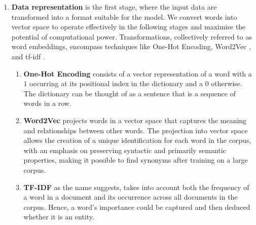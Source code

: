 \begin{enumerate}
    \item \textbf{Data representation} is the first stage, where the input data are transformed into a format suitable for the model. We convert words into vector space to operate effectively in the following stages and maximise the potential of computational power. Transformations, collectively referred to as word embeddings, encompass techniques like One-Hot Encoding, Word2Vec \parencite{mikolov2013word2vec}, and \acrfull{tf-idf} \parencite{AIZAWA200345tfidf}. 
    
    \begin{enumerate}
    \item \textbf{One-Hot Encoding} consists of a vector representation of a word with a $1$ occurring at its positional index in the dictionary and a $0$ otherwise. The dictionary can be thought of as a sentence that is a sequence of words in a row.

    \item \textbf{Word2Vec} projects words in a vector space that captures the meaning and relationships between other words. The projection into vector space allows the creation of a unique identification for each word in the corpus, with an emphasis on preserving syntactic and primarily semantic properties, making it possible to find synonyms after training on a large corpus.

    \item \textbf{TF-IDF} as the name suggests, takes into account both the frequency of a word in a document and its occurrence across all documents in the corpus. Hence, a word's importance could be captured and then deduced whether it is an entity.
    \end{enumerate}


\end{enumerate}
